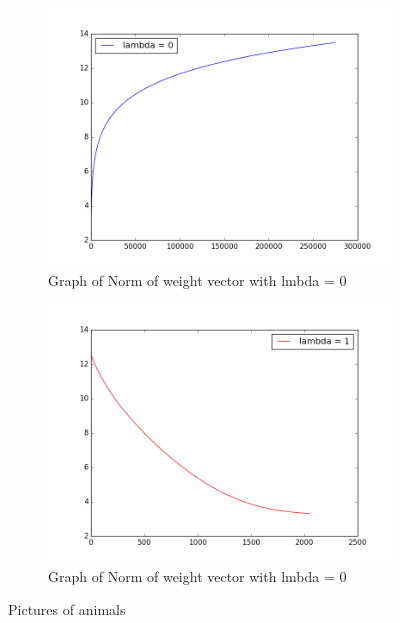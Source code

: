 \documentclass[10pt,twoside]{article}
\begin{document}
\begin{figure}[h]
        \begin{subfigure}[b]{0.5\textwidth}
                \centering
                \includegraphics[width=\linewidth]{Figures/P1/1_1_L0.png}
                \caption{Graph of Norm of weight vector with lmbda = 0}
        \end{subfigure}%
        \begin{subfigure}[b]{0.5\textwidth}
                \centering
                \includegraphics[width=\linewidth]{Figures/P1/1_1_L1.png}
                \caption{Graph of Norm of weight vector with lmbda = 0}
        \end{subfigure}
        \caption{Pictures of animals}
\end{figure}
\end{document}
